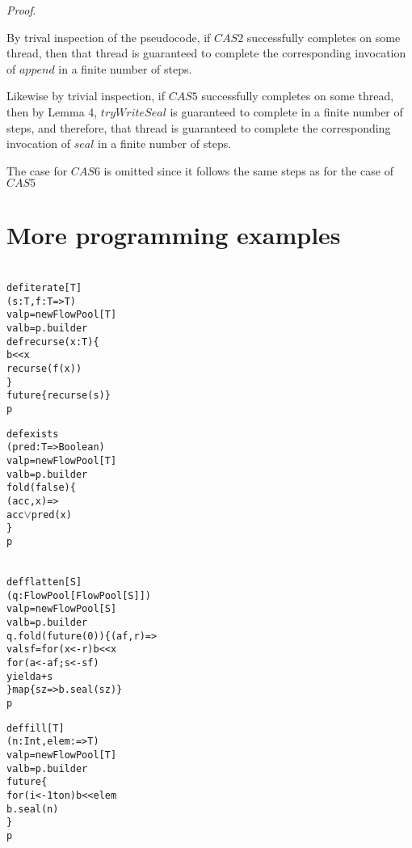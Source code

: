 \documentclass[runningheads,a4paper]{llncs}
\begin{document}
\textit{Proof}. 

By trival inspection of the pseudocode, if $CAS2$ successfully completes on
some thread, then that thread is guaranteed to complete the corresponding
invocation of $append$ in a finite number of steps.

Likewise by trivial inspection, if $CAS5$ successfully completes on some
thread, then by Lemma 4, $tryWriteSeal$ is guaranteed to complete in a finite
number of steps, and therefore, that thread is guaranteed to complete the
corresponding invocation of $seal$ in a finite number of steps.

The case for $CAS6$ is omitted since it follows the same steps as for the case
of $CAS5$

\pagebreak



\section{More programming examples}



\begin{minipage}[b]{3.75 cm}
\begin{alltt}
{\scriptsize
def iterate[T]
  (s: T, f: T => T)
  val p = new FlowPool[T]
  val b = p.builder
  def recurse(x: T) \{
    b << x
    recurse(f(x))
  \}
  future \{ recurse(s) \}
  p
}
\end{alltt}
\end{minipage}
\begin{minipage}[b]{3.9 cm}
\begin{alltt}
{\scriptsize
def exists
  (pred: T => Boolean)
  val p = new FlowPool[T]
  val b = p.builder
  fold(false) \{
    (acc, x) =>
    acc \(\vee\) pred(x)
  \}
  p

}
\end{alltt}
\end{minipage}
\begin{minipage}[b]{4.7 cm}
\begin{alltt}
{\scriptsize
def flatten[S]
  (q: FlowPool[FlowPool[S]])
  val p = new FlowPool[S]
  val b = p.builder
  q.fold(future(0)) \{ (af, r) =>
    val sf = for (x <- r) b << x
    for (a <- af; s <- sf)
      yield a + s
  \} map \{ sz => b.seal(sz) \}
  p
}
\end{alltt}
\end{minipage}



\begin{minipage}[b]{4 cm}
\begin{alltt}
{\scriptsize
def fill[T]
  (n: Int, elem: =>T)
  val p = new FlowPool[T]
  val b = p.builder
  future \{
    for (i <- 1 to n) b << elem
    b.seal(n)
  \}
  p

}
\end{alltt}
\end{minipage}
 
\end{document}
